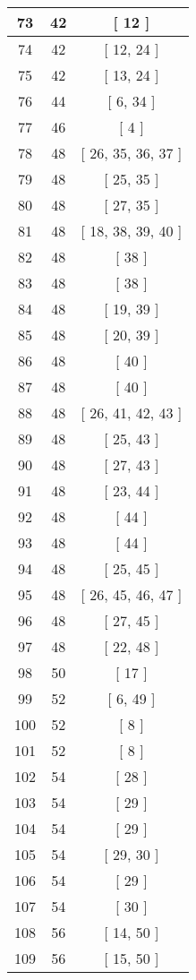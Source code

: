 \begin{center}
\begin{longtable}[H]{|| c c c ||}
\hline
73 & 42 & [ 12 ] \\ 
\hline
74 & 42 & [ 12, 24 ] \\ 
\hline
75 & 42 & [ 13, 24 ] \\ 
\hline
76 & 44 & [ 6, 34 ] \\ 
\hline
77 & 46 & [ 4 ] \\ 
\hline
78 & 48 & [ 26, 35, 36, 37 ] \\ 
\hline
79 & 48 & [ 25, 35 ] \\ 
\hline
80 & 48 & [ 27, 35 ] \\ 
\hline
81 & 48 & [ 18, 38, 39, 40 ] \\ 
\hline
82 & 48 & [ 38 ] \\ 
\hline
83 & 48 & [ 38 ] \\ 
\hline
84 & 48 & [ 19, 39 ] \\ 
\hline
85 & 48 & [ 20, 39 ] \\ 
\hline
86 & 48 & [ 40 ] \\ 
\hline
87 & 48 & [ 40 ] \\ 
\hline
88 & 48 & [ 26, 41, 42, 43 ] \\ 
\hline
89 & 48 & [ 25, 43 ] \\ 
\hline
90 & 48 & [ 27, 43 ] \\ 
\hline
91 & 48 & [ 23, 44 ] \\ 
\hline
92 & 48 & [ 44 ] \\ 
\hline
93 & 48 & [ 44 ] \\ 
\hline
94 & 48 & [ 25, 45 ] \\ 
\hline
95 & 48 & [ 26, 45, 46, 47 ] \\ 
\hline
96 & 48 & [ 27, 45 ] \\ 
\hline
97 & 48 & [ 22, 48 ] \\ 
\hline
98 & 50 & [ 17 ] \\ 
\hline
99 & 52 & [ 6, 49 ] \\ 
\hline
100 & 52 & [ 8 ] \\ 
\hline
101 & 52 & [ 8 ] \\ 
\hline
102 & 54 & [ 28 ] \\ 
\hline
103 & 54 & [ 29 ] \\ 
\hline
104 & 54 & [ 29 ] \\ 
\hline
105 & 54 & [ 29, 30 ] \\ 
\hline
106 & 54 & [ 29 ] \\ 
\hline
107 & 54 & [ 30 ] \\ 
\hline
108 & 56 & [ 14, 50 ] \\ 
\hline
109 & 56 & [ 15, 50 ] \\ 

\end{longtable}
\end{center}
